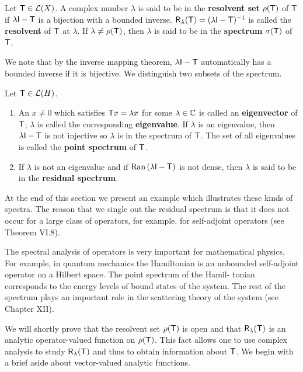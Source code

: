 \begin{definition}
    Let $\mathsf{T} \in \mathcal L(X)$. A complex number $\lambda$ is said to be in the \textbf{resolvent set} $\rho(\mathsf{T})$ of $\mathsf{T}$ if $\lambda \mathsf{I} - \mathsf{T}$ is a bijection with a bounded inverse. $\mathsf{R}_{\lambda}(\mathsf{T}) = (\lambda \mathsf{I} - \mathsf{T})^{-1}$ is called the \textbf{resolvent} of $\mathsf{T}$ at $\lambda$. If $\lambda \neq \rho(\mathsf{T})$, then $\lambda$ is said to be in the \textbf{spectrum} $\sigma(\mathsf{T})$ of $\mathsf{T}$.
\end{definition}

We note that by the inverse mapping theorem, $\lambda \mathsf{I} - \mathsf{T}$ automatically has a bounded inverse if it is bijective. We distinguish two subsets of the spectrum.

\begin{definition}
    Let $\mathsf{T} \in \mathcal L(H)$.
    \begin{enumerate}
        \item An $x \neq 0$ which satisfies $\mathsf{T} x = \lambda x$ for some $\lambda \in \mathbb{C}$ is called an \textbf{eigenvector} of $\mathsf{T}$; $\lambda$ is called the corresponding \textbf{eigenvalue}. If $\lambda$ is an eigenvalue, then $\lambda \mathsf{I} - \mathsf{T}$ is not injective so $\lambda$ is in the spectrum of $\mathsf{T}$. The set of all eigenvalues is called the \textbf{point spectrum} of $\mathsf{T}$.
        \item If $\lambda$ is not an eigenvalue and if $\mathrm{Ran}\, (\lambda \mathsf{I} - \mathsf{T})$ is not dense, then $\lambda$ is said to be in the \textbf{residual spectrum}.
    \end{enumerate}
\end{definition}

At the end of this section we present an example which illustrates these kinds of spectra. The reason that we single out the residual spectrum is that it does not occur for a large class of operators, for example, for self-adjoint operators (see Theorem VI.8).

The spectral analysis of operators is very important for mathematical physics. For example, in quantum mechanics the Hamiltonian is an unbounded self-adjoint operator on a Hilbert space. The point spectrum of the Hamil- tonian corresponds to the energy levels of bound states of the system. The rest of the spectrum plays an important role in the scattering theory of the system (see Chapter XII).

We will shortly prove that the resolvent set $\rho(\mathsf{T})$ is open and that $\mathsf{R}_{\lambda}(\mathsf{T})$ is an analytic operator-valued function on $\rho(\mathsf{T})$. This fact allows one to use complex analysis to study $\mathsf{R}_{\lambda}(\mathsf{T})$ and thus to obtain information about $\mathsf{T}$. We begin
with a brief aside about vector-valued analytic functions.

